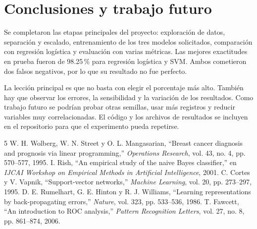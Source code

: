 \documentclass[conference]{IEEEtran}
\begin{document}
\section{Conclusiones y trabajo futuro}
Se completaron las etapas principales del proyecto: exploración de datos, separación y escalado, entrenamiento de los tres modelos solicitados, comparación con regresión logística y evaluación con varias métricas. Las mejores exactitudes en prueba fueron de 98.25\,\% para regresión logística y SVM. Ambos cometieron dos falsos negativos, por lo que su resultado no fue perfecto.

La lección principal es que no basta con elegir el porcentaje más alto. También hay que observar los errores, la sensibilidad y la variación de los resultados. Como trabajo futuro se podrían probar otras semillas, usar más registros y reducir variables muy correlacionadas. El código y los archivos de resultados se incluyen en el repositorio para que el experimento pueda repetirse.

\begin{thebibliography}{5}
 W. H. Wolberg, W. N. Street y O. L. Mangasarian, ``Breast cancer diagnosis and prognosis via linear programming,'' \emph{Operations Research}, vol. 43, no. 4, pp. 570--577, 1995.
 I. Rish, ``An empirical study of the naive Bayes classifier,'' en \emph{IJCAI Workshop on Empirical Methods in Artificial Intelligence}, 2001.
 C. Cortes y V. Vapnik, ``Support-vector networks,'' \emph{Machine Learning}, vol. 20, pp. 273--297, 1995.
 D. E. Rumelhart, G. E. Hinton y R. J. Williams, ``Learning representations by back-propagating errors,'' \emph{Nature}, vol. 323, pp. 533--536, 1986.
 T. Fawcett, ``An introduction to ROC analysis,'' \emph{Pattern Recognition Letters}, vol. 27, no. 8, pp. 861--874, 2006.
\end{thebibliography}
\end{document}
